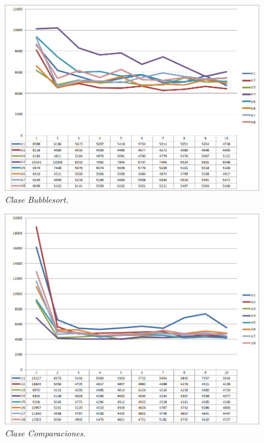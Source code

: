 \begin{figure}[H]
	\centering
	\includegraphics[scale=.4]{images/Figura5-8}
	\caption{\em Clase Bubblesort.}
	\label{fig:des-im8}
\end{figure}

\begin{figure}[H]
	\centering
	\includegraphics[scale=.4]{images/Figura5-9}
	\caption{\em Clase Comparaciones.}
	\label{fig:des-im9}
\end{figure}


